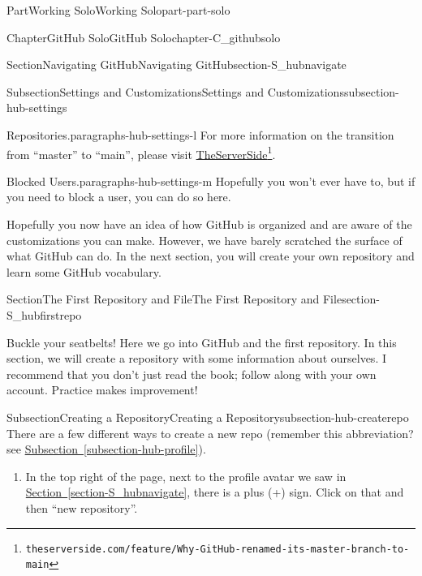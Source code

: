 \documentclass[oneside,10pt,]{book}
\newcommand{\xreffont}{\relax}
\begin{document}
\begin{partptx}{Part}{Working Solo}{}{Working Solo}{}{}{part-part-solo}
\begin{chapterptx}{Chapter}{GitHub Solo}{}{GitHub Solo}{}{}{chapter-C_githubsolo}
\begin{sectionptx}{Section}{Navigating GitHub}{}{Navigating GitHub}{}{}{section-S_hubnavigate}
\begin{subsectionptx}{Subsection}{Settings and Customizations}{}{Settings and Customizations}{}{}{subsection-hub-settings}
\begin{paragraphs}{Repositories.}{paragraphs-hub-settings-l}
For more information on the transition from ``master'' to ``main'', please visit \href{https://www.theserverside.com/feature/Why-GitHub-renamed-its-master-branch-to-main}{TheServerSide}\footnote{\nolinkurl{theserverside.com/feature/Why-GitHub-renamed-its-master-branch-to-main}\label{fn-hub-settings-l-e-d}}.%
\end{paragraphs}%
\begin{paragraphs}{Blocked Users.}{paragraphs-hub-settings-m}%
%
Hopefully you won't ever have to, but if you need to block a user, you can do so here.%
\end{paragraphs}%
\end{subsectionptx}
\begin{conclusion}{}%
Hopefully you now have an idea of how GitHub is organized and are aware of the customizations you can make. However, we have barely scratched the surface of what GitHub can do. In the next section, you will create your own repository and learn some GitHub vocabulary.%
\end{conclusion}%
\end{sectionptx}
%
%
\typeout{************************************************}
\typeout{************************************************}
%
\begin{sectionptx}{Section}{The First Repository and File}{}{The First Repository and File}{}{}{section-S_hubfirstrepo}
%
%
\begin{introduction}{}%
Buckle your seatbelts! Here we go into GitHub and the first repository. In this section, we will create a repository with some information about ourselves. I recommend that you don't just read the book; follow along with your own account. Practice makes improvement!%
\end{introduction}%
%
%
\typeout{************************************************}
\typeout{************************************************}
%
\begin{subsectionptx}{Subsection}{Creating a Repository}{}{Creating a Repository}{}{}{subsection-hub-createrepo}
%
There are a few different ways to create a new repo (remember this abbreviation? see \hyperref[subsection-hub-profile]{Subsection~{\xreffont\ref{subsection-hub-profile}}}).%
\begin{enumerate}
\item{}In the top right of the page, next to the profile avatar we saw in \hyperref[section-S_hubnavigate]{Section~{\xreffont\ref{section-S_hubnavigate}}}, there is a plus (+) sign. Click on that and then ``new repository''.%

\end{enumerate}
\end{subsectionptx}
\end{sectionptx}
\end{chapterptx}
\end{partptx}
\end{document}

